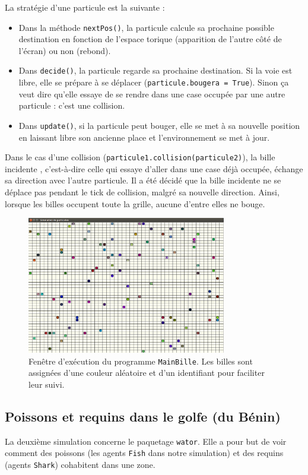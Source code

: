 \documentclass[a4paper]{article}
\begin{document}
\medskip
La stratégie d'une particule est la suivante :
\begin{itemize}
\item Dans la méthode \texttt{nextPos()}, la particule calcule sa prochaine possible destination en fonction de l'espace torique (apparition de \og l'autre côté \fg{} de l'écran) ou non (rebond).
\item Dans \texttt{decide()}, la particule regarde sa prochaine destination. Si la voie est libre, elle se prépare à se déplacer (\texttt{particule.bougera = True}). Sinon ça veut dire qu'elle essaye de se rendre dans une case occupée par une autre particule : c'est une collision.
\item Dans \texttt{update()}, si la particule peut bouger, elle se met à sa nouvelle position en laissant libre son ancienne place et l'environnement se met à jour.
\end{itemize}

\medskip
Dans le cas d'une collision (\texttt{particule1.collision(particule2)}), la bille \og incidente \fg{}, c'est-à-dire celle qui essaye d'aller dans une case déjà occupée, échange sa direction avec l'autre particule. Il a été décidé que la bille incidente ne se déplace pas pendant le tick de collision, malgré sa nouvelle direction. Ainsi, lorsque les billes occupent toute la grille, aucune d'entre elles ne bouge.
 
\begin{figure}[!h]
\centering
\includegraphics[height=6cm]{particules.png}
\caption{Fenêtre d'exécution du programme \texttt{MainBille}. Les billes sont assignées d'une couleur aléatoire et d'un identifiant pour faciliter leur suivi.}
\end{figure}
\newpage

\subsection{Poissons et requins dans le golfe (du Bénin)}
La deuxième simulation concerne le paquetage \texttt{wator}. Elle a pour but de voir comment des poissons (les agents \texttt{Fish} dans notre simulation) et des requins (agents \texttt{Shark}) cohabitent dans une zone. 
\end{document}
